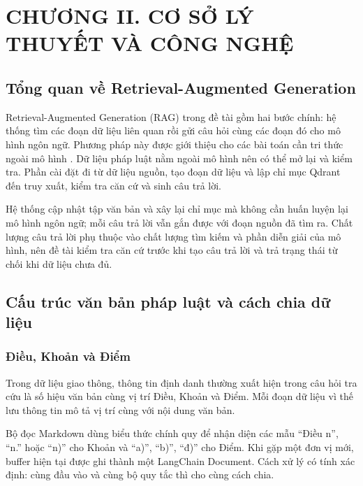 \documentclass[12pt,a4paper,oneside]{report}
\begin{document}
\clearpage
\setcounter{chapter}{2}
\setcounter{section}{0}
\setcounter{subsection}{0}
\setcounter{figure}{0}
\setcounter{table}{0}
\chapter*{CHƯƠNG II. CƠ SỞ LÝ THUYẾT VÀ CÔNG NGHỆ}

\section{Tổng quan về Retrieval-Augmented Generation}
Retrieval-Augmented Generation (RAG) trong đề tài gồm hai bước chính: hệ thống tìm các đoạn dữ liệu liên quan rồi gửi câu hỏi cùng các đoạn đó cho mô hình ngôn ngữ. Phương pháp này được giới thiệu cho các bài toán cần tri thức ngoài mô hình \cite{rag_lewis_2020}. Dữ liệu pháp luật nằm ngoài mô hình nên có thể mở lại và kiểm tra. Phần cài đặt đi từ dữ liệu nguồn, tạo đoạn dữ liệu và lập chỉ mục Qdrant đến truy xuất, kiểm tra căn cứ và sinh câu trả lời.

Hệ thống cập nhật tập văn bản và xây lại chỉ mục mà không cần huấn luyện lại mô hình ngôn ngữ; mỗi câu trả lời vẫn gắn được với đoạn nguồn đã tìm ra. Chất lượng câu trả lời phụ thuộc vào chất lượng tìm kiếm và phần diễn giải của mô hình, nên đề tài kiểm tra căn cứ trước khi tạo câu trả lời và trả trạng thái từ chối khi dữ liệu chưa đủ.


\section{Cấu trúc văn bản pháp luật và cách chia dữ liệu}
\subsection{Điều, Khoản và Điểm}
Trong dữ liệu giao thông, thông tin định danh thường xuất hiện trong câu hỏi tra cứu là số hiệu văn bản cùng vị trí Điều, Khoản và Điểm. Mỗi đoạn dữ liệu vì thế lưu thông tin mô tả vị trí cùng với nội dung văn bản.

Bộ đọc Markdown dùng biểu thức chính quy để nhận diện các mẫu ``Điều n'', ``n.'' hoặc ``n)'' cho Khoản và ``a)'', ``b)'', ``đ)'' cho Điểm. Khi gặp một đơn vị mới, buffer hiện tại được ghi thành một LangChain Document. Cách xử lý có tính xác định: cùng đầu vào và cùng bộ quy tắc thì cho cùng cách chia.
\end{document}
